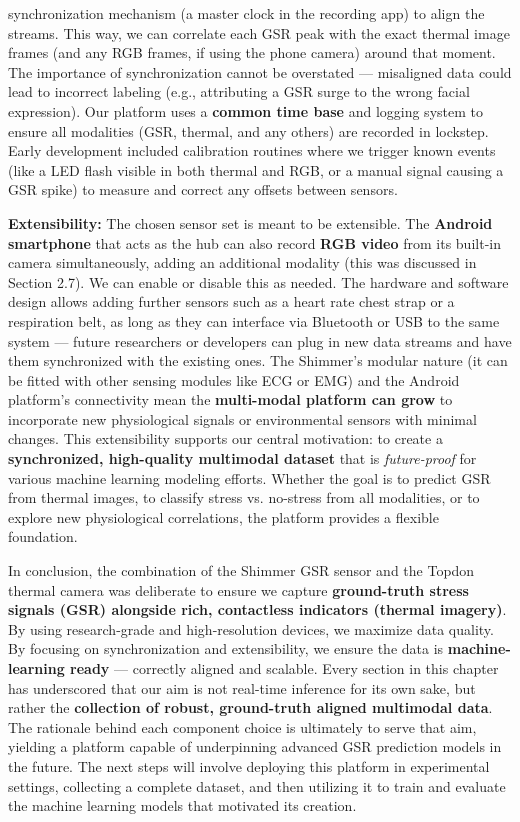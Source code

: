 \documentclass[11pt,a4paper]{report}
\begin{document}
synchronization mechanism (a master clock in the recording app) to align
the streams. This way, we can correlate each GSR peak with the exact
thermal image frames (and any RGB frames, if using the phone camera)
around that moment. The importance of synchronization cannot be
overstated --- misaligned data could lead to incorrect labeling (e.g.,
attributing a GSR surge to the wrong facial expression). Our platform
uses a \textbf{common time base} and logging system to ensure all modalities
(GSR, thermal, and any others) are recorded in lockstep. Early
development included calibration routines where we trigger known events
(like a LED flash visible in both thermal and RGB, or a manual signal
causing a GSR spike) to measure and correct any offsets between sensors.

\textbf{Extensibility:} The chosen sensor set is meant to be extensible. The
\textbf{Android smartphone} that acts as the hub can also record \textbf{RGB
video} from its built-in camera simultaneously, adding an additional
modality (this was discussed in Section 2.7). We can enable or disable
this as needed. The hardware and software design allows adding further
sensors such as a heart rate chest strap or a respiration belt, as long
as they can interface via Bluetooth or USB to the same system --- future
researchers or developers can plug in new data streams and have them
synchronized with the existing ones. The Shimmer's modular nature (it
can be fitted with other sensing modules like ECG or EMG) and the
Android platform's connectivity mean the \textbf{multi-modal platform can
grow} to incorporate new physiological signals or environmental sensors
with minimal changes. This extensibility supports our central
motivation: to create a \textbf{synchronized, high-quality multimodal
dataset} that is \textit{future-proof} for various machine learning modeling
efforts. Whether the goal is to predict GSR from thermal images, to
classify stress vs. no-stress from all modalities, or to explore new
physiological correlations, the platform provides a flexible foundation.

In conclusion, the combination of the Shimmer GSR sensor and the Topdon
thermal camera was deliberate to ensure we capture \textbf{ground-truth stress
signals (GSR) alongside rich, contactless indicators (thermal
imagery)}. By using research-grade and high-resolution devices, we
maximize data quality. By focusing on synchronization and extensibility,
we ensure the data is \textbf{machine-learning ready} --- correctly aligned
and scalable. Every section in this chapter has underscored that our aim
is not real-time inference for its own sake, but rather the \textbf{collection
of robust, ground-truth aligned multimodal data}. The rationale behind
each component choice is ultimately to serve that aim, yielding a
platform capable of underpinning advanced GSR prediction models in the
future. The next steps will involve deploying this platform in
experimental settings, collecting a complete dataset, and then
utilizing it to train and evaluate the machine learning models that
motivated its creation.



\end{document}
